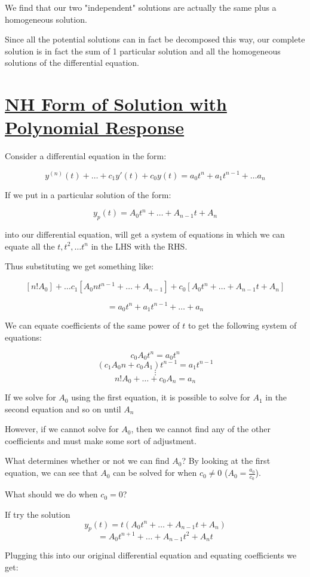 \documentclass{report}
\begin{document}
We find that our two "independent" solutions are actually the same plus a homogeneous solution.

Since all the potential solutions can in fact be decomposed this way, our complete solution is in fact the sum of 1 particular solution and all the homogeneous solutions of the differential equation.


\section{\hyperref[th:polyResp]{NH Form of Solution with Polynomial Response}}
\label{sec:prPolyResp}
Consider a differential equation in the form:

$$y^{(n)}(t) + \dots + c_1y'(t) + c_0y(t) = a_0t^n + a_1t^{n-1} + \dots a_n$$

If we put in a particular solution of the form:

$$y_p(t) = A_0t^n + \dots + A_{n-1}t + A_n$$

into our differential equation, will get a system of equations in which we can equate all the $t, t^2, \dots t^n$ in the LHS with the RHS.

Thus substituting we get something like:

$$[n!A_0] + \dots c_1[A_0nt^{n-1}+\dots+A_{n-1}] + c_0[A_0t^n + \dots + A_{n-1}t + A_n]$$

$$= a_0t^n + a_1t^{n-1} + \dots + a_n$$

We can equate coefficients of the same power of $t$ to get the following system of equations:

$$c_0A_0t^n = a_0t^n$$
$$(c_1A_0n + c_0A_1)t^{n-1} = a_1t^{n-1}$$
$$\vdots$$
$$n!A_0 + \dots + c_0A_n = a_n$$


If we solve for $A_0$ using the first equation, it is possible to solve for $A_1$ in the second equation and so on until $A_n$

However, if we cannot solve for $A_0$, then we cannot find any of the other coefficients and must make some sort of adjustment.

What determines whether or not we can find $A_0$? By looking at the first equation, we can see that $A_0$ can be solved for when $c_0 \neq 0$ ($A_0 = \frac{a_0}{c_0}$).

What should we do when $c_0 = 0$?

If try the solution
$$y_p(t) = t(A_0t^n + \dots + A_{n-1}t + A_n)$$
$$=A_0t^{n+1} + \dots + A_{n-1}t^2 + A_nt$$


Plugging this into our original differential equation and equating coefficients we get:
\end{document}
